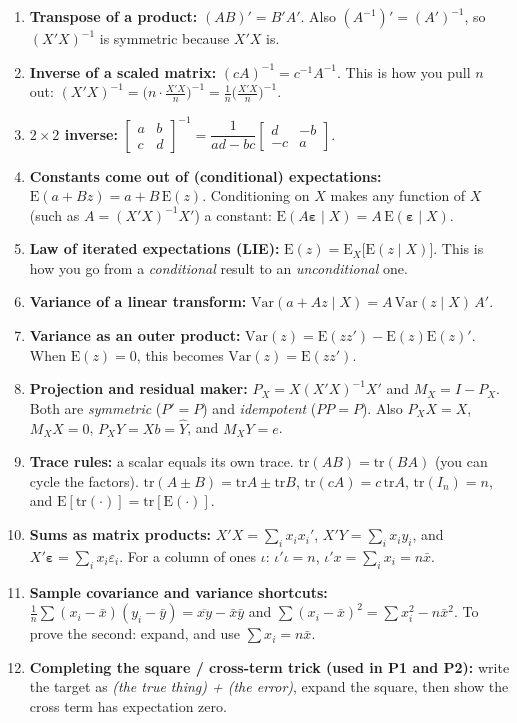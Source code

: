 \documentclass[11pt]{article}
\newcommand{\E}{\mathrm{E}}
\newcommand{\Var}{\mathrm{Var}}
\newcommand{\tr}{\mathrm{tr}}
\newcommand{\veps}{\bm{\varepsilon}}
\begin{document}
\begin{enumerate}[label=\textbf{T\arabic*.},leftmargin=2.2em,itemsep=3pt]
\item \textbf{Transpose of a product:} $(AB)'=B'A'$. Also $(A^{-1})'=(A')^{-1}$, so $(X'X)^{-1}$ is symmetric because $X'X$ is.
\item \textbf{Inverse of a scaled matrix:} $(cA)^{-1}=c^{-1}A^{-1}$. This is how you pull $n$ out: $(X'X)^{-1}=\big(n\cdot\tfrac{X'X}{n}\big)^{-1}=\tfrac1n\big(\tfrac{X'X}{n}\big)^{-1}$.
\item \textbf{$2\times2$ inverse:} $\begin{bmatrix}a&b\\c&d\end{bmatrix}^{-1}=\dfrac{1}{ad-bc}\begin{bmatrix}d&-b\\-c&a\end{bmatrix}$.
\item \textbf{Constants come out of (conditional) expectations:} $\E(a+Bz)=a+B\,\E(z)$. Conditioning on $X$ makes any function of $X$ (such as $A=(X'X)^{-1}X'$) a constant: $\E(A\veps\mid X)=A\,\E(\veps\mid X)$.
\item \textbf{Law of iterated expectations (LIE):} $\E(z)=\E_X\big[\E(z\mid X)\big]$. This is how you go from a \emph{conditional} result to an \emph{unconditional} one.
\item \textbf{Variance of a linear transform:} $\Var(a+A z\mid X)=A\,\Var(z\mid X)\,A'$.
\item \textbf{Variance as an outer product:} $\Var(z)=\E(zz')-\E(z)\E(z)'$. When $\E(z)=0$, this becomes $\Var(z)=\E(zz')$.
\item \textbf{Projection and residual maker:} $P_X=X(X'X)^{-1}X'$ and $M_X=I-P_X$. Both are \emph{symmetric} ($P'=P$) and \emph{idempotent} ($PP=P$). Also $P_XX=X$, $M_XX=0$, $P_XY=Xb=\hat Y$, and $M_XY=e$.
\item \textbf{Trace rules:} a scalar equals its own trace. $\tr(AB)=\tr(BA)$ (you can cycle the factors). $\tr(A\pm B)=\tr A\pm\tr B$, $\tr(cA)=c\,\tr A$, $\tr(I_n)=n$, and $\E[\tr(\cdot)]=\tr[\E(\cdot)]$.
\item \textbf{Sums as matrix products:} $X'X=\sum_i x_ix_i'$, $X'Y=\sum_i x_iy_i$, and $X'\veps=\sum_i x_i\varepsilon_i$. For a column of ones $\iota$: $\iota'\iota=n$, $\iota'x=\sum_ix_i=n\bar x$.
\item \textbf{Sample covariance and variance shortcuts:} $\tfrac1n\sum(x_i-\bar x)(y_i-\bar y)=\overline{xy}-\bar x\bar y$ and $\sum(x_i-\bar x)^2=\sum x_i^2-n\bar x^2$. To prove the second: expand, and use $\sum x_i=n\bar x$.
\item \textbf{Completing the square / cross-term trick (used in P1 and P2):} write the target as \emph{(the true thing) + (the error)}, expand the square, then show the cross term has expectation zero.
\end{enumerate}
\end{document}
